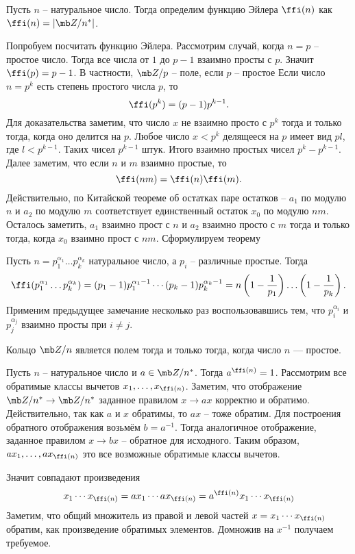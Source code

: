 \dfn Пусть $n$ -- натуральное число. Тогда определим функцию Эйлера $\ffi(n)$ как $\ffi(n)=|\mb Z/n^*|$. 
\edfn 

Попробуем посчитать функцию Эйлера. Рассмотрим случай, когда $n=p$ -- простое число. Тогда все числа от $1$ до $p-1$ взаимно просты с $p$. Значит $\ffi(p)=p-1$.
\rm В частности, $\mb Z/p$ -- поле, если $p$ --  простое
\erm
Если число $n=p^k$ есть степень простого числа $p$, то $$\ffi(p^k)=(p-1)p^{k-1}.$$
Для доказательства заметим, что число $x$ не взаимно просто с $p^k$ тогда и только тогда, когда оно делится на $p$. Любое число $x<p^k$ делящееся на $p$ имеет вид $pl$, где $l<p^{k-1}$. Таких чисел $p^{k-1}$ штук. Итого взаимно простых чисел $p^k-p^{k-1}$. \\
Далее заметим, что если  $n$ и $m$ взаимно простые, то 
$$\ffi(nm)=\ffi(n)\ffi(m).$$ 
Действительно, по Китайской теореме об остатках паре остатков -- $a_1$ по модулю $n$ и $a_2$ по модулю $m$ соответствует единственный остаток $x_0$ по модулю $nm$. Осталось заметить, $a_1$ взаимно прост с $n$  и $a_2$ взаимно просто с $m$ тогда и только тогда, когда $x_0$ взаимно прост с $nm$. Сформулируем теорему

\thrm
Пусть $n=p_1^{\alpha_1}\dots p_k^{\alpha_k}$ натуральное число, а $p_i$ -- различные простые. Тогда
$$\ffi(p_1^{\alpha_1}\dots p_k^{\alpha_k})=(p_1-1)p_1^{\alpha_1-1}\cdots (p_k-1)p_k^{\alpha_k-1}=n\left(1-\frac{1}{p_1}\right)\dots\left(1-\frac{1}{p_k}\right).$$
\ethrm
\proof Применим предыдущее замечание несколько раз воспользовавшись тем, что $p_i^{\alpha_i}$  и $p_j^{\alpha_j}$ взаимно просты при $i\neq j$. 
\endproof

 Кольцо $\mb Z/n$ является полем тогда и только тогда, когда число $n$ --- простое.
\ecrl

\thrm[Эйлера] Пусть $n$ -- натуральное число и $a\in \mb Z/n^*$. Тогда $a^{\ffi(n)}=1$.
\ethrm
\proof
Рассмотрим все обратимые классы вычетов $x_1,\dots,x_{\ffi(n)}$. Заметим, что отображение $\mb Z/n^* \to \mb Z/n^*$ заданное правилом $x\to ax$ корректно и обратимо. Действительно, так как $a$ и $x$ обратимы, то $ax$ -- тоже обратим. Для построения обратного отображения возьмём $b=a^{-1}$. Тогда аналогичное отображение, заданное правилом $x\to b x$ -- обратное для исходного. Таким образом, $ax_1,\dots,ax_{\ffi(n)}$ это все возможные обратимые классы вычетов.

Значит совпадают произведения
$$ x_1\cdots x_{\ffi(n)} = a x_1 \cdots ax_{\ffi(n)} = a^{\ffi(n)} x_1 \cdots x_{\ffi(n)} $$ 
Заметим, что общий множитель из правой и левой частей $x=x_1 \cdots x_{\ffi(n)}$ обратим, как произведение обратимых элементов. Домножив на $x^{-1}$ получаем требуемое.

